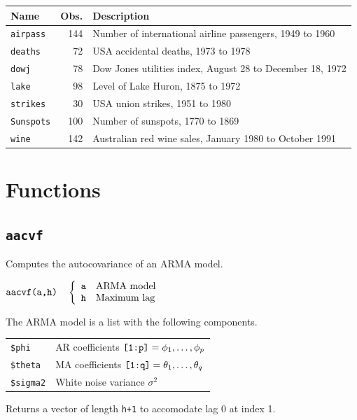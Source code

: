 \documentclass[11pt]{article}
\begin{document}
\begin{center}
\begin{tabular}{|l|r|l|}
\hline
Name & Obs. & Description\\
\hline
{\tt airpass} & 144 & Number of international airline passengers, 1949 to 1960\\
{\tt deaths} & 72 & USA accidental deaths, 1973 to 1978\\
{\tt dowj} & 78 & Dow Jones utilities index, August 28 to December 18, 1972\\
{\tt lake} & 98 & Level of Lake Huron, 1875 to 1972\\
{\tt strikes} & 30 & USA union strikes, 1951 to 1980\\
{\tt Sunspots} & 100 & Number of sunspots, 1770 to 1869\\
{\tt wine} & 142 & Australian red wine sales, January 1980 to October 1991\\
\hline
\end{tabular}
\end{center}

\newpage

\section{Functions}

\subsection{\tt aacvf}
Computes the autocovariance of an ARMA model.

\bigskip
$
\hbox{\tt aacvf(a,h)}\quad\left\{\begin{array}{ll}
{\tt a} & \hbox{ARMA model}\\
{\tt h} & \hbox{Maximum lag}
\end{array}\right.
$

\bigskip
\noindent
The ARMA model is a list with the following components.

\begin{center}
\begin{tabular}{ll}
{\tt \$phi} & AR coefficients $\hbox{\tt[1:p]}=\phi_1,\ldots,\phi_p$\\
{\tt \$theta} & MA coefficients $\hbox{\tt[1:q]}=\theta_1,\ldots,\theta_q$\\
{\tt \$sigma2} & White noise variance $\sigma^2$
\end{tabular}
\end{center}

\noindent
Returns a vector of length {\tt h+1} to accomodate lag 0 at index 1.
\end{document}
